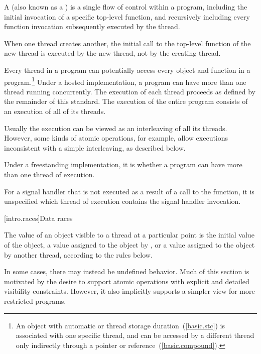 \pnum
{}%
%
A  (also known as a ) is a single flow of
control within a program, including the initial invocation of a specific
top-level function, and recursively including every function invocation
subsequently executed by the thread. \begin{note} When one thread creates another,
the initial call to the top-level function of the new thread is executed by the
new thread, not by the creating thread. \end{note} Every thread in a program can
potentially access every object and function in a program.\footnote{An object
with automatic or thread storage duration~(\ref{basic.stc}) is associated with
one specific thread, and can be accessed by a different thread only indirectly
through a pointer or reference~(\ref{basic.compound}).} Under a hosted
implementation, a \Cpp program can have more than one thread running
concurrently. The execution of each thread proceeds as defined by the remainder
of this standard. The execution of the entire program consists of an execution
of all of its threads. \begin{note} Usually the execution can be viewed as an
interleaving of all its threads. However, some kinds of atomic operations, for
example, allow executions inconsistent with a simple interleaving, as described
below. \end{note} Under a freestanding implementation, it is  whether a program can
have more than one thread of execution.

\pnum
For a signal handler that is not executed as a result of a call to the
 function, it is unspecified which thread of execution
contains the signal handler invocation.

[intro.races]{Data races}

\pnum
The value of an object visible to a thread  at a particular point is the
initial value of the object, a value assigned to the object by , or a
value assigned to the object by another thread, according to the rules below.
\begin{note} In some cases, there may instead be undefined behavior. Much of this
section is motivated by the desire to support atomic operations with explicit
and detailed visibility constraints. However, it also implicitly supports a
simpler view for more restricted programs. \end{note}

